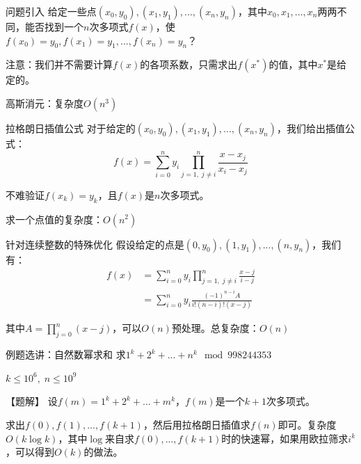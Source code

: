 \documentclass{beamer}
\begin{document}
\begin{frame}{问题引入}
    给定一些点$(x_0,y_0),(x_1,y_1),...,(x_n,y_n)$，其中$x_0,x_1,...,x_n$两两不同，能否找到一个$n$次多项式$f(x)$，使$f(x_0)=y_0,f(x_1)=y_1,...,f(x_n)=y_n$？

    \vspace{1em}
    注意：我们并不需要计算$f(x)$的各项系数，只需求出$f(x^*)$的值，其中$x^*$是给定的。

    \vspace{1em}
    \pause 高斯消元：复杂度$O(n^3)$
\end{frame}

\begin{frame}{拉格朗日插值公式}
    对于给定的$(x_0,y_0),(x_1,y_1),...,(x_n,y_n)$，我们给出插值公式：
    \begin{equation*}
        f(x)=\sum_{i=0}^n y_i \prod_{j=1,\;j\neq i}^n \frac{x-x_j}{x_i-x_j}
    \end{equation*}

    不难验证$f(x_k)=y_k$，且$f(x)$是$n$次多项式。

    \pause
    求一个点值的复杂度：$O(n^2)$
\end{frame}

\begin{frame}{针对连续整数的特殊优化}
    假设给定的点是$(0,y_0),(1,y_1),...,(n,y_n)$，我们有：
    \begin{align*}
        f(x)&= \sum_{i=0}^n y_i \prod_{j=1,\;j\neq i}^n \frac{x-j}{i-j}\\
        &= \sum_{i=0}^n y_i \frac{(-1)^{n-i}A}{i!(n-i)!(x-j)}
    \end{align*}

    其中$A=\prod_{j=0}^n(x-j)$，可以$O(n)$预处理。总复杂度：$O(n)$
\end{frame}

\begin{frame}{例题选讲：自然数幂求和}
    求$1^k+2^k+...+n^k \mod 998244353$

    $k\leq 10^6,\;n\leq 10^9$

    \pause
    \vspace{1em}
    【题解】 设$f(m)=1^k+2^k+...+m^k$，$f(m)$是一个$k+1$次多项式。

    \pause
    \vspace{1em}
    求出$f(0),f(1),...,f(k+1)$，然后用拉格朗日插值求$f(n)$即可。复杂度$O(k\log k)$，其中$\log$来自求$f(0),...,f(k+1)$时的快速幂，如果用欧拉筛求$i^k$，可以得到$O(k)$的做法。

\end{frame}
\end{document}
